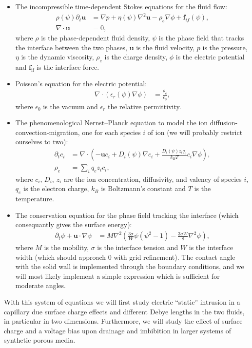 \documentclass[a4paper,10pt]{article}
\numberwithin{equation}{section}
\numberwithin{figure}{section}
\renewcommand{\v}[1]{\mathbf{#1}}
\newcommand{\intf}{\textrm{if}}
\begin{document}
\begin{itemize} 
\item The incompressible time-dependent Stokes equations for the fluid flow:
  \begin{align}
    \rho(\psi) \partial_t \mathbf{u}  &= \nabla p +\eta(\psi) \nabla^2 \mathbf{u} -  \rho_e  \nabla \phi + \mathbf{f}_{if}(\psi),  \\  
    \nabla \cdot\mathbf{u} &= 0,
  \end{align}
  where $\rho$ is the phase-dependent fluid density, $\psi$ is the phase field that tracks the interface between the two phases, $\v u$ is the fluid velocity, $p$ is the pressure, $\eta$ is the dynamic viscosity, $\rho_e$ is the charge density, $\phi$ is the electric potential and $\v f_{\intf}$ is the interface force.
\item Poisson's equation for the electric potential: 
  \begin{align}
    \nabla\cdot\left(\epsilon_r(\psi)\nabla\phi\right) &= \frac{\rho_e}{\epsilon_0 },
  \end{align}
  where $\epsilon_0$ is the vacuum  and $\epsilon_r$ the relative permittivity.
\item The phenomenological Nernst--Planck equation to model the ion diffusion-convection-migration, one for each species $i$ of ion (we will probably restrict ourselves to two):
  \begin{align}
    \partial_t c_i  &=  \nabla  \cdot  \left( - \mathbf{u} c_i  + D_i(\psi) \nabla c_i  +   \frac{D_i(\psi) z_i q_e}{k_B T} c_i \nabla \phi \right), \\
\rho_e &= \sum_i q_e z_i c_i, 
  \end{align}
  where $c_i$, $D_i$, $z_i$ are the ion concentration, diffusivity, and valency of species $i$, $q_e$ is the electron charge, $k_B$ is Boltzmann's constant and $T$ is the temperature.
\item The conservation equation for the phase field tracking the interface (which consequantly gives the surface energy):
  \begin{align}
    \partial_t \psi + \mathbf{u}\cdot\nabla\psi &= M\nabla^2\left(\frac{3 \sigma }{W} \psi \left(\psi^2 -1\right) - \frac{3 \sigma W}{8}\nabla^2 \psi\right),
  \end{align}
  where $M$ is the mobility, $\sigma$ is the interface tension and $W$ is the interface width (which should approach 0 with grid refinement).
  The contact angle with the solid wall is implemented through the boundary conditions, and we will most likely implement a simple expression which is sufficient for moderate angles.
\end{itemize}
With this system of equations we will first study electric ``static'' intrusion in a capillary due surface charge effects and different Debye lengths in the two fluids, in particular in two dimensions.
Furthermore, we will study the effect of surface charge and a voltage bias upon drainage and imbibition in larger systems of synthetic porous media.
\end{document}
